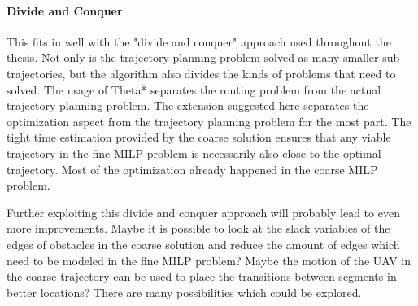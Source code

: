\paragraph{Divide and Conquer}
This fits in well with the "divide and conquer" approach used throughout the thesis. Not only is the trajectory planning problem solved as many smaller sub-trajectories, but the algorithm also divides the kinds of problems that need to solved. The usage of Theta* separates the routing problem from the actual trajectory planning problem. The extension suggested here separates the optimization aspect from the trajectory planning problem for the most part. The tight time estimation provided by the coarse solution ensures that any viable trajectory in the fine MILP problem is necessarily also close to the optimal trajectory. Most of the optimization already happened in the coarse MILP problem.
\par
Further exploiting this divide and conquer approach will probably lead to even more improvements. Maybe it is possible to look at the slack variables of the edges of obstacles in the coarse solution and reduce the amount of edges which need to be modeled in the fine MILP problem? Maybe the motion of the UAV in the coarse trajectory can be used to place the transitions between segments in better locations? There are many possibilities which could be explored.

